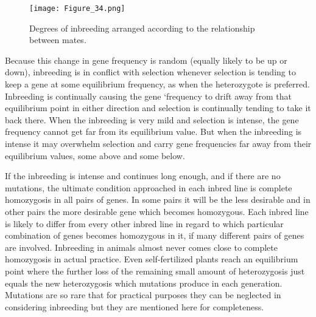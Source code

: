 \begin{figure}
	\centering
    \texttt{[image: Figure\_34.png]}
    \caption{Degrees of inbreeding arranged according to the relationship between mates.}
    \label{fig:Lush_Figure_34}
\end{figure}

Because this change in gene frequency is random (equally likely to
be up or down), inbreeding is in conflict with selection whenever selection
is tending to keep a gene at some equilibrium frequency, as when
the heterozygote is preferred. Inbreeding is continually causing the
gene `frequency to drift away from that equilibrium point in either
direction and selection is continually tending to take it back there.
When the inbreeding is very mild and selection is intense, the gene frequency
cannot get far from its equilibrium value. But when the
inbreeding is intense it may overwhelm selection and carry gene frequencies
far away from their equilibrium values, some above and some
below.

If the inbreeding is intense and continues long enough, and if there
are no mutations, the ultimate condition approached in each inbred
line is complete homozygosis in all pairs of genes. In some pairs it will
be the less desirable and in other pairs the more desirable gene which
becomes homozygous. Each inbred line is likely to differ from every other
inbred line in regard to which particular combination of genes
becomes homozygous in it, if many different pairs of genes are involved.
Inbreeding in animals almost never comes close to complete homozygosis
in actual practice. Even self-fertilized plants reach an equilibrium
point where the further loss of the remaining small amount of heterozygosis
just equals the new heterozygosis which mutations produce in
each generation. Mutations are so rare that for practical purposes they
can be neglected in considering inbreeding but they are mentioned
here for completeness.

